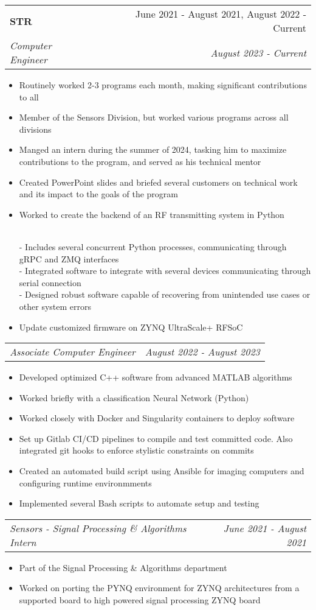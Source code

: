 \documentclass[letterpaper,11pt]{article}
\makeatletter
\newcommand{\resumeItem}[1]{
  \item\small{
    {#1 \vspace{-2pt}}
  }
}
\newcommand{\resumeSubheading}[4]{
  \vspace{-2pt}\item
    \begin{tabular*}{0.97\textwidth}[t]{l@{\extracolsep{\fill}}r}
      \textbf{#1} & #2 \\
      \textit{\small#3} & \textit{\small #4} \\
    \end{tabular*}\vspace{-7pt}
}
\newcommand{\resumeSubSubheading}[2]{
    \item
    \begin{tabular*}{0.97\textwidth}{l@{\extracolsep{\fill}}r}
      \textit{\small#1} & \textit{\small #2} \\
    \end{tabular*}\vspace{-7pt}
}
\newcommand{\resumeItemListStart}{\begin{itemize}}
\newcommand{\resumeItemListEnd}{\end{itemize}\vspace{-5pt}}
\makeatother
\begin{document}
    \resumeSubheading
      {STR}{June 2021 - August 2021, August 2022 - Current}
      {Computer Engineer}{August 2023 - Current}
        \resumeItemListStart
          \resumeItem{Routinely worked 2-3 programs each month, making significant contributions to all}
          \resumeItem{Member of the Sensors Division, but worked various programs across all divisions}
          \resumeItem{Manged an intern during the summer of 2024, tasking him to maximize contributions to the program, and served as his technical mentor}
          \resumeItem{Created PowerPoint slides and briefed several customers on technical work and its impact to the goals of the program}
          \resumeItem{Worked to create the backend of an RF transmitting system in Python}
            \\ {\quad - Includes several concurrent Python processes, communicating through gRPC and ZMQ interfaces}
            \\ {\quad - Integrated software to integrate with several devices communicating through serial connection}
            \\ {\quad - Designed robust software capable of recovering from unintended use cases or other system errors}
          \resumeItem{Update customized firmware on ZYNQ UltraScale+ RFSoC}  
        \resumeItemListEnd
      
      \resumeSubSubheading
        {Associate Computer Engineer}{August 2022 - August 2023}
        \resumeItemListStart
          \resumeItem{Developed optimized C++ software from advanced MATLAB algorithms}
          \resumeItem{Worked briefly with a classification Neural Network (Python)}
          \resumeItem{Worked closely with Docker and Singularity containers to deploy software}
          \resumeItem{Set up Gitlab CI/CD pipelines to compile and test committed code. Also integrated git hooks to enforce stylistic constraints on commits}
          \resumeItem{Created an automated build script using Ansible for imaging computers and configuring runtime environmments}
          \resumeItem{Implemented several Bash scripts to automate setup and testing}
        \resumeItemListEnd

      \resumeSubSubheading
        {Sensors - Signal Processing \& Algorithms Intern}{June 2021 - August 2021}
        \resumeItemListStart
          \resumeItem{Part of the Signal Processing \& Algorithms department}
          \resumeItem{Worked on porting the PYNQ environment for ZYNQ architectures from a supported board to high powered signal processing ZYNQ board}
        \resumeItemListEnd
    
\end{document}
